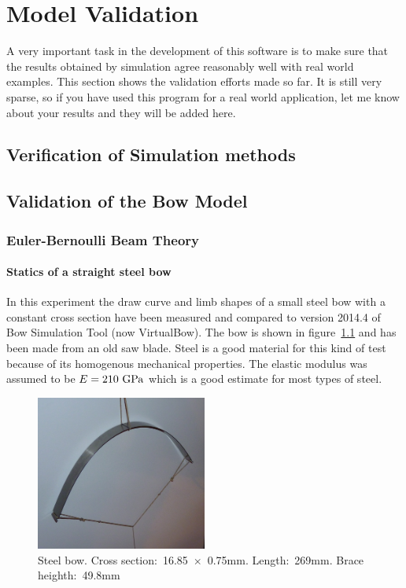 
\chapter{Model Validation} 

A very important task in the development of this software is to make sure that the results obtained by simulation agree reasonably well with real world examples.
This section shows the validation efforts made so far.
It is still very sparse, so if you have used this program for a real world application, let me know about your results and they will be added here.




\section{Verification of Simulation methods}



\section{Validation of the Bow Model}

\subsection{Euler-Bernoulli Beam Theory}

\subsubsection{Statics of a straight steel bow}

In this experiment the draw curve and limb shapes of a small steel bow with a constant cross section have been measured and compared to version 2014.4 of Bow Simulation Tool (now VirtualBow).
The bow is shown in figure~\ref{fig:validation:setup} and has been made from an old saw blade.
Steel is a good material for this kind of test because of its homogenous mechanical properties.
The elastic modulus was assumed to be $E = 210\ \rm{GPa}$ which is a good estimate for most types of steel.

\begin{figure}[H]
\centering
\includegraphics[width=0.5\textwidth]{figures/validation/setup.png}
\caption{Steel bow. Cross section:~16.85~$\times$~0.75mm. Length:~269mm. Brace heighth:~49.8mm}
\label{fig:validation:setup}
\end{figure}

